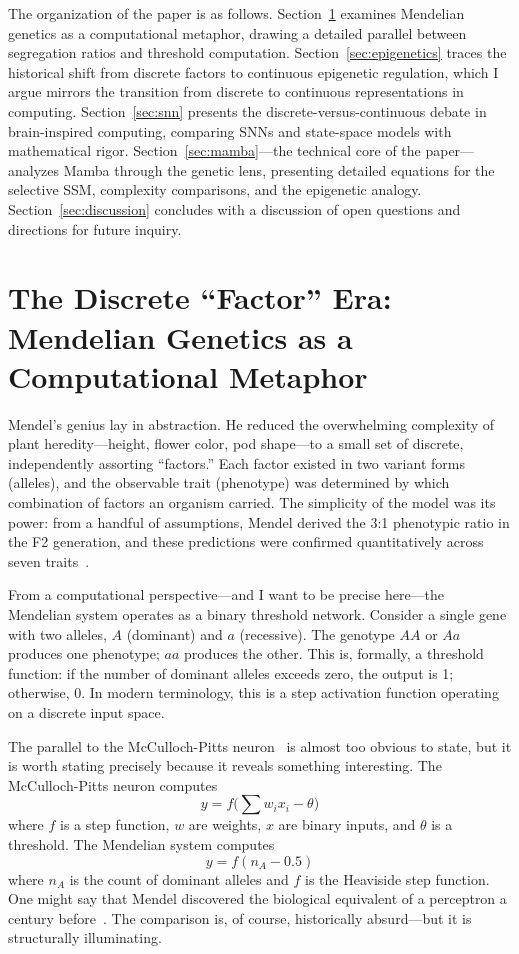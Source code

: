 \documentclass[12pt,a4paper]{article}
\begin{document}
The organization of the paper is as follows. Section~\ref{sec:mendel} examines Mendelian genetics as a computational metaphor, drawing a detailed parallel between segregation ratios and threshold computation. Section~\ref{sec:epigenetics} traces the historical shift from discrete factors to continuous epigenetic regulation, which I argue mirrors the transition from discrete to continuous representations in computing. Section~\ref{sec:snn} presents the discrete-versus-continuous debate in brain-inspired computing, comparing SNNs and state-space models with mathematical rigor. Section~\ref{sec:mamba}---the technical core of the paper---analyzes Mamba through the genetic lens, presenting detailed equations for the selective SSM, complexity comparisons, and the epigenetic analogy. Section~\ref{sec:discussion} concludes with a discussion of open questions and directions for future inquiry.

\section{The Discrete ``Factor'' Era: Mendelian Genetics as a Computational Metaphor}
\label{sec:mendel}

Mendel's genius lay in abstraction. He reduced the overwhelming complexity of plant heredity---height, flower color, pod shape---to a small set of discrete, independently assorting ``factors.'' Each factor existed in two variant forms (alleles), and the observable trait (phenotype) was determined by which combination of factors an organism carried. The simplicity of the model was its power: from a handful of assumptions, Mendel derived the 3:1 phenotypic ratio in the F2 generation, and these predictions were confirmed quantitatively across seven traits~\cite{mendel1866,fisher1936}.

From a computational perspective---and I want to be precise here---the Mendelian system operates as a binary threshold network. Consider a single gene with two alleles, $A$ (dominant) and $a$ (recessive). The genotype $AA$ or $Aa$ produces one phenotype; $aa$ produces the other. This is, formally, a threshold function: if the number of dominant alleles exceeds zero, the output is 1; otherwise, 0. In modern terminology, this is a step activation function operating on a discrete input space.

The parallel to the McCulloch-Pitts neuron~\cite{mcculloch1943} is almost too obvious to state, but it is worth stating precisely because it reveals something interesting. The McCulloch-Pitts neuron computes
\[
y = f\bigl(\textstyle\sum w_i x_i - \theta\bigr)
\]
where $f$ is a step function, $w$ are weights, $x$ are binary inputs, and $\theta$ is a threshold. The Mendelian system computes
\[
y = f(n_A - 0.5)
\]
where $n_A$ is the count of dominant alleles and $f$ is the Heaviside step function. One might say that Mendel discovered the biological equivalent of a perceptron a century before~\cite{rosenblatt1958}. The comparison is, of course, historically absurd---but it is structurally illuminating.
\end{document}
